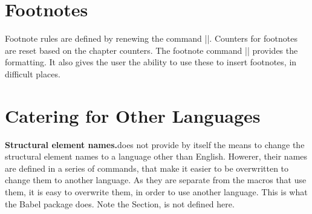 \section{Footnotes}
\label{book:footnotes}

\begin{macro}{\footnoterule}
\begin{macro}{\@makefntext}
\begin{macro}{\@makefnmark}
 Footnote rules are defined by renewing the command |\footnoterule|. Counters for footnotes are reset based on the chapter counters. The footnote command |\@makefntext| provides the formatting. It also gives the user the ability to use these to insert footnotes, in difficult places.
\end{macro}
\end{macro}
\end{macro}

\begin{teX}
\renewcommand\footnoterule{%
  \kern-3\p@
  \hrule\@width.4\columnwidth 
  \kern2.6\p@}


\newcommand\@makefntext[1]{%
    \parindent 1em%
    \noindent
    \hb@xt@1.8em{\hss\@makefnmark}#1}
\end{teX}

\section*{Catering for Other Languages}

\begin{multicols}{2}
\textbf{Structural element names.}\quad \latex does not provide by itself the means to change the structural element names to a language other than English. Howerer, their names are defined  in a series of commands, that make it easier to be overwritten to change them to another language. As they are separate from the macros that use them, it is easy to overwrite them, in order to use another language. This is what the Babel package does. Note the Section, is not defined here.
\end{multicols}

\begin{teX}
\newcommand\contentsname{Contents}
\newcommand\listfigurename{List of Figures}
\newcommand\listtablename{List of Tables}
\newcommand\bibname{Bibliography}
\newcommand\indexname{Index}
\newcommand\figurename{Figure}
\newcommand\tablename{Table}
\newcommand\partname{Part}
\newcommand\chaptername{Chapter}
\newcommand\appendixname{Appendix}
\end{teX}

